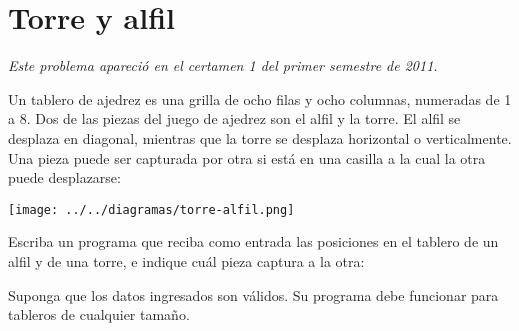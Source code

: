 \section{Torre y alfil}

\emph{Este problema apareció en el certamen 1 del primer semestre de
2011.}

Un tablero de ajedrez es una grilla de ocho filas y ocho columnas,
numeradas de 1 a 8. Dos de las piezas del juego de ajedrez son el alfil
y la torre. El alfil se desplaza en diagonal, mientras que la torre se
desplaza horizontal o verticalmente. Una pieza puede ser capturada por
otra si está en una casilla a la cual la otra puede desplazarse:

\texttt{[image: ../../diagramas/torre-alfil.png]}

Escriba un programa que reciba como entrada las posiciones en el tablero
de un alfil y de una torre, e indique cuál pieza captura a la otra:

Suponga que los datos ingresados son válidos. Su programa debe funcionar
para tableros de cualquier tamaño.
